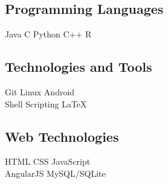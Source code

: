 \documentclass[]{chowes-resume}
\begin{document}
\begin{minipage}[t]{0.33\textwidth}
\subsection{Programming Languages}
Java \textbullet{} C \textbullet{} Python \textbullet{} C++ \textbullet{} R
\sectionsep

\subsection{Technologies and Tools}
Git \textbullet{} Linux \textbullet{} Android \\
Shell Scripting \textbullet{} \LaTeX
\sectionsep

\subsection{Web Technologies}
HTML \textbullet{} CSS \textbullet{} JavaScript \\ 
AngularJS \textbullet{} MySQL/SQLite
\sectionsep


%
%

\end{minipage} 
\hfill
\end{document}
